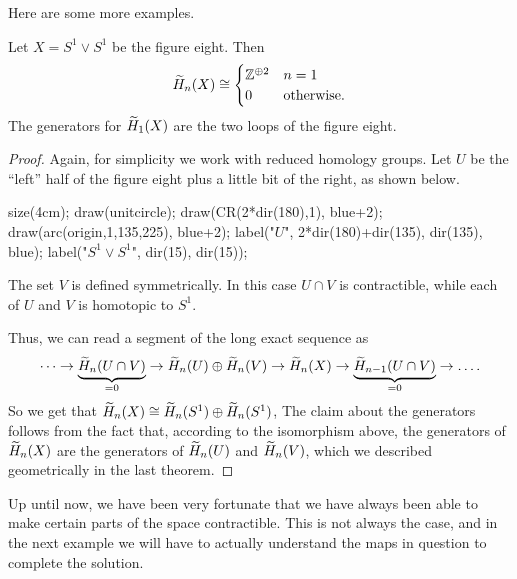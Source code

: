 Here are some more examples.
\begin{proposition}
	Let $X = S^1 \vee S^1$ be the figure eight.
	Then
	\[
		\widetilde H_n(X) \cong
		\begin{cases}
			\mathbb Z^{\oplus 2} & n = 1 \\
			0 & \text{otherwise}.
		\end{cases}
	\]
	The generators for $\widetilde H_1(X)$ are the two loops of the figure eight.
\end{proposition}
\begin{proof}
	Again, for simplicity we work with reduced homology groups.
	Let $U$ be the ``left'' half of the figure eight plus a little bit of the right,
	as shown below.
	\begin{center}
		\begin{asy}
			size(4cm);
			draw(unitcircle);
			draw(CR(2*dir(180),1), blue+2);
			draw(arc(origin,1,135,225), blue+2);
			label("$U$", 2*dir(180)+dir(135), dir(135), blue);
			label("$S^1 \vee S^1$", dir(15), dir(15));
		\end{asy}
	\end{center}
	The set $V$ is defined symmetrically.
	In this case $U \cap V$ is contractible, while each of $U$ and $V$
	is homotopic to $S^1$.

	Thus, we can read a segment of the long exact sequence as
	\[
		\dots \to
		\underbrace{\widetilde H_n(U \cap V)}_{=0}
		\to \widetilde H_n(U) \oplus \widetilde H_n(V) \to \widetilde H_n(X) \to 
		\underbrace{\widetilde H_{n-1}(U \cap V)}_{=0} \to \dots.
	\]
	So we get that $\widetilde H_n(X) \cong \widetilde H_n(S^1) \oplus \widetilde H_n(S^1)$,
	The claim about the generators follows from the fact that, 
	according to the isomorphism above,
	the generators of $\widetilde H_n(X)$ are the generators of $\widetilde H_n(U)$
	and $\widetilde H_n(V)$, which we described geometrically
	in the last theorem.
\end{proof}

Up until now, we have been very fortunate that we have always been able to make
certain parts of the space contractible.
This is not always the case, and in the next example we will have to
actually understand the maps in question to complete the solution.

